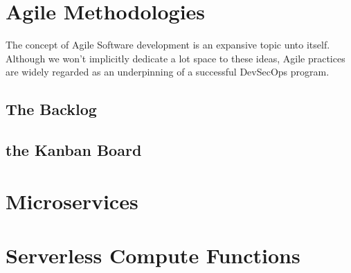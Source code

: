 \section{Agile Methodologies}
\justify{}
The concept of Agile Software development is an expansive topic
unto itself. Although we won't implicitly dedicate a lot space to these
ideas, Agile practices are widely regarded as an underpinning of a successful
DevSecOps program.
\subsection{The Backlog}
\subsection{the Kanban Board}
\section{Microservices}
\section{Serverless Compute Functions}
